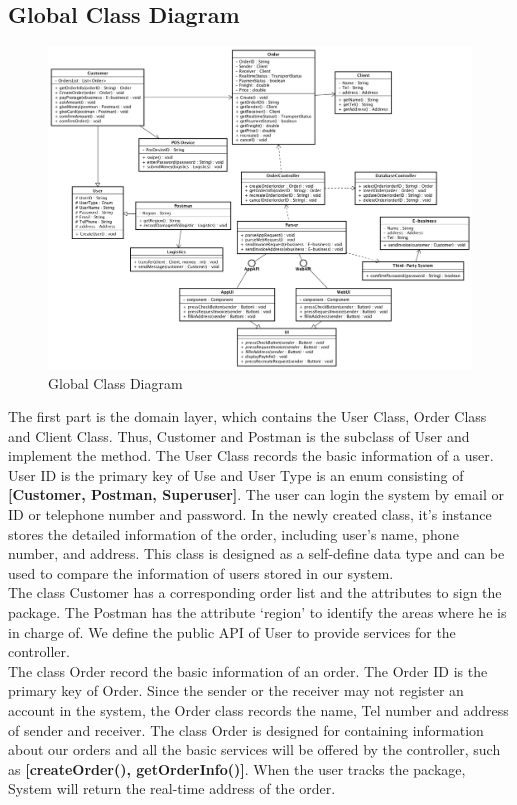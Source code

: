 \documentclass[12pt]{scrreprt}
\begin{document}
\subsection{Global Class Diagram}
\begin{figure}[H]
  \centering\includegraphics[width=6in]{DocumentRes/ClassDiagram.png}
  \caption{Global Class Diagram}
\end{figure}
The first part is the domain layer, which contains the User Class, Order Class and Client Class. Thus, Customer and Postman is the subclass of User and implement the method. The User Class records the basic information of a user. User ID is the primary key of Use and User Type is an enum consisting of \textbf{[Customer, Postman, Superuser]}. The user can login the system by email or ID or telephone number and password. In the newly created class, it's instance stores the detailed information of the order, including user's name, phone number, and address. This class is designed as a self-define data type and can be used to compare the information of users stored in our system.\\
The class Customer has a corresponding order list and the attributes to sign the package. The Postman has the attribute ‘region’ to identify the areas where he is in charge of. We define the public API of User to provide services for the controller.\\
The class Order record the basic information of an order. The Order ID is the primary key of Order. Since the sender or the receiver may not register an account in the system, the Order class records the name, Tel number and address of sender and receiver. The class Order is designed for containing information about our orders and all the basic services will be offered by the controller, such as \textbf{[createOrder(), getOrderInfo()]}. When the user tracks the package, System will return the real-time address of the order.\\
\end{document}
